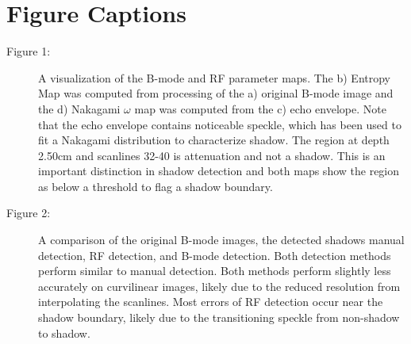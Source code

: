 \documentclass[authoryear,preprint,review,12pt]{elsarticle}
\begin{document}
\pagebreak







\pagebreak

\section*{Figure Captions}

\begin{description}
\item[Figure 1:]  A visualization of the B-mode and RF parameter maps. The b) Entropy Map was computed from processing of the a) original B-mode image and the d) Nakagami $\omega$ map was computed from the c) echo envelope. Note that the echo envelope contains noticeable speckle, which has been used to fit a Nakagami distribution to characterize shadow. The region at depth 2.50cm and scanlines 32-40 is attenuation and not a shadow. This is an important distinction in shadow detection and both maps show the region as below a threshold to flag a shadow boundary.
\item[Figure 2:]  A comparison of the original B-mode images, the detected shadows manual detection, RF detection, and B-mode detection. Both detection methods perform similar to manual detection. Both methods perform slightly less accurately on curvilinear images, likely due to the reduced resolution from interpolating the scanlines. Most errors of RF detection occur near the shadow boundary, likely due to the transitioning speckle from non-shadow to shadow.
\end{description}



\end{document}
